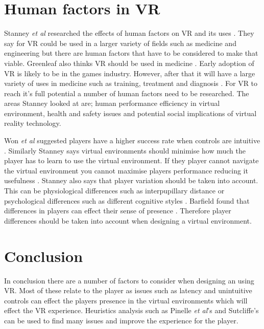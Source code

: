 \documentclass{scrartcl}
\begin{document}
\section{Human factors in VR}
Stanney \textit{et al} researched the effects of human factors on VR and its uses \cite{stanney}. They say for VR could be used in a larger variety of fields such as medicine and engineering but there are human factors that have to be considered to make that viable. Greenleaf also thinks VR should be used in medicine \cite{Greenleaf}. Early adoption of VR is likely to be in the games industry. However, after that it will have a large variety of uses in medicine such as training, treatment and diagnosis \cite{Greenleaf}.  For VR to reach it's full potential a number of human factors need to be researched. The areas Stanney looked at are; human performance efficiency in virtual environment, health and safety issues and potential social implications of virtual reality technology.  

Won \textit{et al} suggested players have a higher success rate when controls are intuitive \cite{won2015homuncular}. Similarly Stanney   says virtual environments should minimise how much the player has to learn to use the virtual environment. If they player cannot navigate the virtual environment you cannot maximise players performance reducing it usefulness \cite{stanney}.  Stanney also says that player variation should be taken into account. This can be physiological differences such as interpupillary distance or psychological differences such as different cognitive styles \cite{stanney}. Barfield found that differences in players can effect their sense of presence \cite{barfield1993sense}. Therefore player differences should be taken into account when designing a virtual environment.

\section{Conclusion}
In conclusion there are a number of factors to consider when designing an using VR. Most of these relate to the player as issues such as latency and unintuitive controls can effect the players presence in the virtual environments which will effect the VR experience. Heuristics analysis such as Pinelle \textit{et al}'s and Sutcliffe's can be used to find many issues and improve the experience for the player.
	


	
\end{document}
